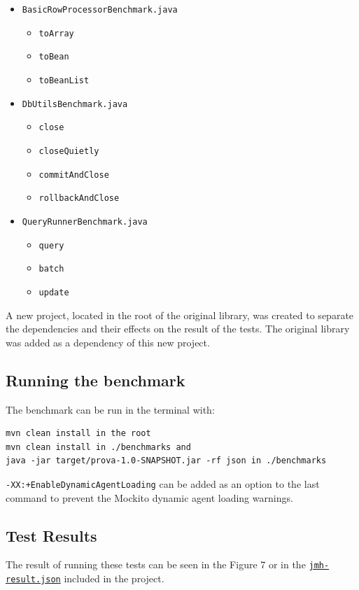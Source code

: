 \documentclass[sigconf]{acmart}
\begin{document}
\begin{itemize}
    \item \texttt{BasicRowProcessorBenchmark.java}
    \begin{itemize}
        \item \texttt{toArray}
        \item \texttt{toBean}
        \item \texttt{toBeanList}
    \end{itemize}
    \item \texttt{DbUtilsBenchmark.java}
    \begin{itemize}
        \item \texttt{close}
        \item \texttt{closeQuietly}
        \item \texttt{commitAndClose}
        \item \texttt{rollbackAndClose}
    \end{itemize}
    \item \texttt{QueryRunnerBenchmark.java}
    \begin{itemize}
        \item \texttt{query}
        \item \texttt{batch}
        \item \texttt{update}
    \end{itemize}
\end{itemize}


A new project, located in the root of the original library, was created to separate the dependencies and their effects on the result of the tests. The original library was added as a dependency of this new project.

\subsection*{Running the benchmark}
The benchmark can be run in the terminal with:

\begin{lstlisting}
mvn clean install in the root
mvn clean install in ./benchmarks and 
java -jar target/prova-1.0-SNAPSHOT.jar -rf json in ./benchmarks
\end{lstlisting}

\texttt{-XX:+EnableDynamicAgentLoading} can be added as an option to the last command to prevent the Mockito dynamic agent loading warnings.

\subsection*{Test Results}
The result of running these tests can be seen in the Figure 7 or in the \href{https://github.com/Erasmus-In-Salerno/commons-dbutils/blob/master/benchmark/jmh-result.json}{\texttt{jmh-result.json}}
included in the project.
\end{document}
